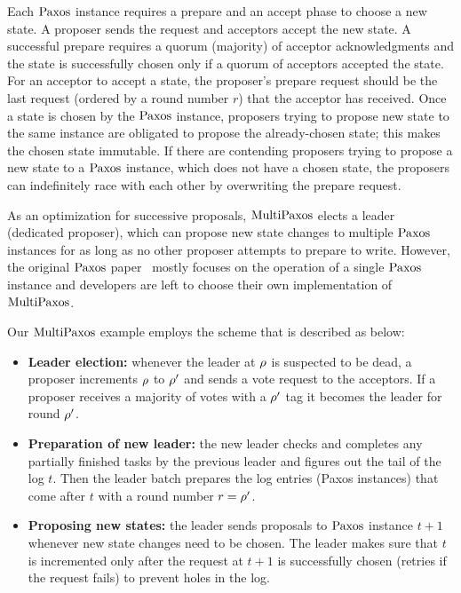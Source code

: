 Each $\mathrm{Paxos}$ instance requires a prepare and an accept phase to choose a new
state. A proposer sends the request and acceptors accept the new state.
A successful prepare requires a quorum (majority) of acceptor acknowledgments
and the state is successfully chosen only if a quorum of acceptors
accepted the state. For an acceptor to accept a state, the proposer's prepare
request should be the last request (ordered by a round number $r$)
that the acceptor has received. Once a state is chosen by the $\mathrm{Paxos}$ instance,
proposers trying to propose new state to the same instance are obligated to
propose the already-chosen state; this makes the chosen state immutable.
If there are contending proposers trying to propose a new
state to a $\mathrm{Paxos}$ instance, which does not have a chosen state, the proposers
can indefinitely race with each other by overwriting the prepare request.

As an optimization for successive proposals, $\mathrm{MultiPaxos}$ elects a
leader (dedicated proposer), which can propose new state changes to multiple $\mathrm{Paxos}$
instances for as long as no other proposer attempts to prepare to write. However, the
original $\mathrm{Paxos}$ paper~\cite{paxos, paxosmadesimple} mostly focuses on the operation
of a single $\mathrm{Paxos}$ instance
and developers are left to choose their own implementation of $\mathrm{MultiPaxos}$.

Our $\mathrm{MultiPaxos}$ example employs the scheme that is described as below:
\begin{itemize}[leftmargin=*]
	\item {\textbf{Leader election: }} whenever the leader at $\rho$ is
		suspected to be dead, a proposer increments $\rho$ to $\rho'$ and
		sends a vote request to the acceptors.
		If a proposer receives a majority of votes with a $\rho'$ tag it
		becomes the leader for round $\rho'$.
	\item {\textbf{Preparation of new leader: }} the new leader checks and completes any
		partially finished tasks by the previous leader and figures out the
		tail of the log $t$. Then the leader batch prepares the log entries
		(Paxos instances) that come after $t$ with a round number $r = \rho'$.
	\item {\textbf{Proposing new states: }} the leader sends proposals
		to $\mathrm{Paxos}$ instance $t+1$ whenever new state changes need to be chosen.
		The leader makes sure that $t$ is incremented only after the
		request at $t+1$ is successfully chosen (retries if the
		request fails) to prevent holes in the log.
\end{itemize}


